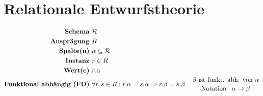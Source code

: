 \documentclass{article}
\begin{document}
	\section*{Relationale Entwurfstheorie}
		\begin{align*}
			\textbf{Schema } & \mathcal{R} \\
			\textbf{Auspr\"agung } & R \\
			\textbf{Spalte(n) } & \alpha \subseteq \mathcal{R}\\
			\textbf{Instanz } & r \in R\\
			\textbf{Wert(e) } & r.\alpha & \\
			\textbf{Funktional abh\"angig (FD) } & \forall r,s \in R: r.\alpha = s.\alpha \Rightarrow r.\beta = s.\beta & {\beta \text{ ist funkt. abh. von } \alpha}\atop{\text{Notation}: \alpha \rightarrow \beta}\\
		\end{align*}
\end{document}

